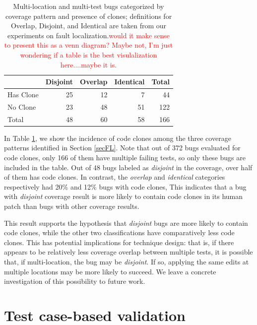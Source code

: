 \documentclass[10pt, conference]{IEEEtran}
\newcommand\todo[1]{\textcolor{red}{#1}}
\begin{document}
\begin{table}
	{\begin{center}
			\begin{tabular} {lrrrr}
				\toprule
				& Disjoint & Overlap & Identical & Total \\
				\midrule
				Has Clone & 25 & 12 & 7 & 44 \\
				No Clone & 23 & 48 & 51 &  122 \\
                \midrule
				Total & 48 & 60 & 58 & 166 \\
                \bottomrule
			\end{tabular}
		\end{center}
	}
	\caption{Multi-location and multi-test bugs categorized by coverage
          pattern and presence of clones; definitions for Overlap, Disjoint, and
          Identical are taken from our experiments on fault
          localization.\todo{would it make sense to present this as a venn
            diagram?  Maybe not, I'm just wondering if a table is the best
            visulalization here....maybe it is.}}
	\label{tab:cov_clones}
\end{table}

In Table \ref{tab:cov_clones}, we show the incidence of code clones among the three 
coverage patterns identified in Section \ref{secFL}. Note that out of 372 bugs evaluated for code clones, only 166 of them have multiple failing tests, so only these bugs are included in the table.  Out of 48 bugs labeled as 
\emph{disjoint} in the coverage, over half of them has code clones. In contrast, the 
\emph{overlap} and \emph{identical} categories respectively had 20\% and 12\% bugs with code clones, 
This indicates that a 
bug with \emph{disjoint} coverage result is more likely to contain code clones in its
human patch than bugs with other coverage results. 

This result supports the hypothesis that \emph{disjoint} bugs are more likely to contain 
code clones, while the other two classifications have comparatively less code
clones. This has potential implications for technique design: that is, if there
appears to be relatively less coverage overlap between multiple tests, it is
possible that, if multi-location, the bug may be \emph{disjoint}.  If so,
applying the same edits at multiple locations may be more likely to succeed.  We
leave a concrete investigation of this possibility to future work.



\section{Test case-based validation}
\label{sec:tests}
\end{document}
